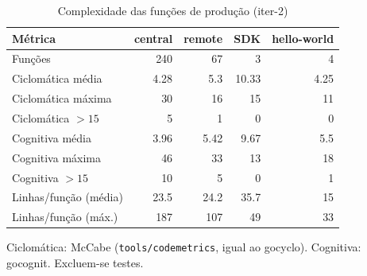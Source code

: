\begin{table}[htbp]
  \centering\small
  \caption{Complexidade das funções de produção (iter-2)}
  \label{tab:iter-2-complexidade}
  \begin{tabular}{lrrrr}
    \toprule
    Métrica & central & remote & SDK & hello-world \\
    \midrule
    Funções & 240 & 67 & 3 & 4 \\
    Ciclomática média & 4.28 & 5.3 & 10.33 & 4.25 \\
    Ciclomática máxima & 30 & 16 & 15 & 11 \\
    Ciclomática $>15$ & 5 & 1 & 0 & 0 \\
    Cognitiva média & 3.96 & 5.42 & 9.67 & 5.5 \\
    Cognitiva máxima & 46 & 33 & 13 & 18 \\
    Cognitiva $>15$ & 10 & 5 & 0 & 1 \\
    Linhas/função (média) & 23.5 & 24.2 & 35.7 & 15 \\
    Linhas/função (máx.) & 187 & 107 & 49 & 33 \\
    \bottomrule
  \end{tabular}
  \par\smallskip\footnotesize Ciclomática: McCabe (\texttt{tools/codemetrics}, igual ao gocyclo). Cognitiva: gocognit. Excluem-se testes.
\end{table}
